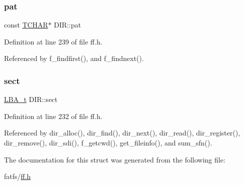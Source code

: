 \mbox{\label{structDIR_a1f636884096de91deb97f59209d60e96}} 
\subsubsection{\texorpdfstring{pat}{pat}}
{\footnotesize\ttfamily const \hyperlink{ff_8h_a03bdb8ce5895c7e261aadc2529637546}{T\+C\+H\+AR}$\ast$ D\+I\+R\+::pat}



Definition at line 239 of file ff.\+h.



Referenced by f\+\_\+findfirst(), and f\+\_\+findnext().

\mbox{\label{structDIR_ae76119034beae8f34eb1536d0ef83a40}} 
\subsubsection{\texorpdfstring{sect}{sect}}
{\footnotesize\ttfamily \hyperlink{ff_8h_a1f3c30a83148a28340f009d4e583f087}{L\+B\+A\+\_\+t} D\+I\+R\+::sect}



Definition at line 232 of file ff.\+h.



Referenced by dir\+\_\+alloc(), dir\+\_\+find(), dir\+\_\+next(), dir\+\_\+read(), dir\+\_\+register(), dir\+\_\+remove(), dir\+\_\+sdi(), f\+\_\+getcwd(), get\+\_\+fileinfo(), and sum\+\_\+sfn().



The documentation for this struct was generated from the following file\+:\begin{DoxyCompactItemize}
\item 
fatfs/\hyperlink{ff_8h}{ff.\+h}\end{DoxyCompactItemize}

